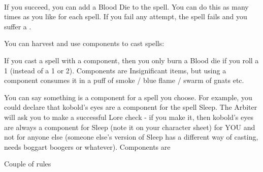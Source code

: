 {{  ~\\
  
}

If you succeed, you can add a Blood Die to the spell.  You can do this as
many times as you like for each spell. If you fail any \RO attempt, the
spell fails and you suffer a .




You can harvest and use components to cast spells:



If you cast a spell with a component, then you only burn a Blood die if you
roll a 1 (instead of a 1 or 2).  Components are Insignificant items, but
using a component consumes it in a puff of smoke / blue flame / swarm of
gnats etc.

You can say something is a component for a spell you choose.  For example,
you could declare that kobold's eyes are a component for the spell Sleep. 
The Arbiter will ask you to make a successful Lore check - if you make it,
then kobold's eyes are always a component for Sleep (note it on your
character sheet) for YOU and not for anyone else (someone else's version of
Sleep has a different way of casting, needs boggart boogers or whatever). 
Components are \UD 

Couple of rules



}
